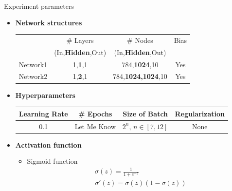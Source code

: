 \begin{frame}{Experiment parameters}
  \begin{itemize}
       \item{ \textbf{Network structures} }
				\begin{center}
				  \begin{tabular}{ | l | c | c | c | }
				    \hline
				      & \cellcolor[gray]{0.85} \# Layers & \cellcolor[gray]{0.85} \# Nodes & \cellcolor[gray]{0.85} Bias \\
				      & \cellcolor[gray]{0.85} (In,\textbf{Hidden},Out) & \cellcolor[gray]{0.85} (In,\textbf{Hidden},Out) &\cellcolor[gray]{0.85}  \\ \hline
				    Network1 & 1,\textbf{1},1 & 784,\textbf{1024},10 & Yes \\ \hline 
				    Network2 & 1,\textbf{2},1 & 784,\textbf{1024,1024},10 & Yes \\
				    \hline
				  \end{tabular}
				\end{center}
				
    \item{ \textbf{Hyperparameters} }
    \begin{center}
				  \begin{tabular}{ | c | c | c | c | }
				    \hline
				      \cellcolor[gray]{0.85} Learning Rate & \cellcolor[gray]{0.85} \# Epochs & \cellcolor[gray]{0.85} Size of Batch & \cellcolor[gray]{0.85} Regularization \\ \hline
				      0.1 & Let Me Know & $2^n$, $n\in[7,12]$ & None \\
				    \hline
				  \end{tabular}
				\end{center}
     \item{ \textbf{Activation function}}
     \begin{itemize}
      		\item{Sigmoid function}
      		\begin{align*}
      		& \sigma(z)=\frac{1}{1+e^{-z}}\\
      		& \sigma'(z)=\sigma(z)(1-\sigma(z))
      		\end{align*}
    \end{itemize}
  \end{itemize}
\end{frame}


